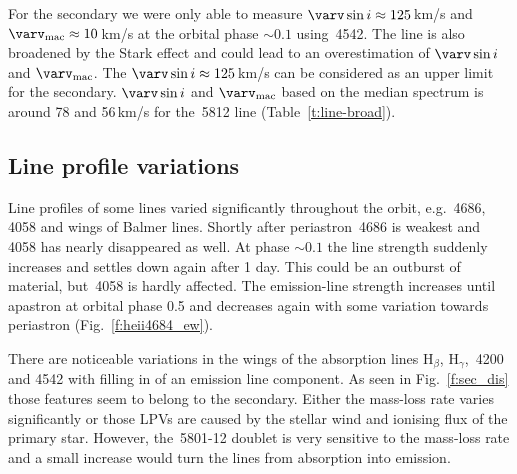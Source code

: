 \documentclass[fleqn,usenatbib]{mnras}
\begin{document}
For the secondary we were only able to measure $\varv \sin i \approx 125$\,km/s and $\varv_{\rm mac}\approx10$\,km/s at the orbital phase $\sim 0.1$ using \,4542. The  line is also broadened by the Stark effect and could lead to an overestimation of $\varv \sin i$ and $\varv_{\rm mac}$. The $\varv \sin i \approx 125$\,km/s can be considered as an upper limit for the secondary. $\varv \sin i$ and $\varv_{\rm mac}$ based on the median spectrum is around 78 and 56\,km/s for the \,5812 line (Table~\ref{t:line-broad}).



\subsection{Line profile variations\label{s:lpv}}

Line profiles of some lines varied significantly throughout the orbit, e.g. \,4686, \,4058 and wings of Balmer lines. %
Shortly after periastron \,4686 is weakest and \,4058 has nearly disappeared as well. At phase $\sim 0.1$ the line strength suddenly increases and settles down again after 1 day. This could be an outburst of material, but \,4058 is hardly affected. The emission-line strength increases until apastron at orbital phase 0.5 and decreases again with some variation towards periastron (Fig.~\ref{f:heii4684_ew}).

There are noticeable variations in the wings of the absorption lines $\mathrm{H}_{\beta}$, $\mathrm{H}_{\gamma}$, \,4200 and 4542 with filling in of an emission line component. As seen in Fig.~\ref{f:sec_dis} those features seem to belong to the secondary. Either the mass-loss rate varies significantly or those LPVs are caused by the stellar wind and ionising flux of the primary star. However, the \,5801-12 doublet is very sensitive to the mass-loss rate and a small increase would turn the lines from absorption into emission.%
\end{document}
